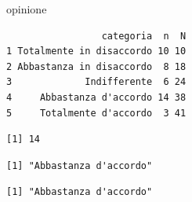 \documentclass[
  a4paper,
  DIV=11,
  numbers=noendperiod]{scrreprt}
\newenvironment{Shaded}{\begin{snugshade}}{\end{snugshade}}
\newcommand{\CommentTok}[1]{\textcolor[rgb]{0.56,0.35,0.01}{\textit{#1}}}
\newcommand{\FunctionTok}[1]{\textcolor[rgb]{0.13,0.29,0.53}{\textbf{#1}}}
\newcommand{\NormalTok}[1]{#1}
\newcommand{\SpecialCharTok}[1]{\textcolor[rgb]{0.81,0.36,0.00}{\textbf{#1}}}
\newcommand{\StringTok}[1]{\textcolor[rgb]{0.31,0.60,0.02}{#1}}
\begin{document}
\begin{Shaded}
\begin{Highlighting}[]
\NormalTok{opinione}
\end{Highlighting}
\end{Shaded}

\begin{verbatim}
                 categoria  n  N
1 Totalmente in disaccordo 10 10
2 Abbastanza in disaccordo  8 18
3             Indifferente  6 24
4     Abbastanza d'accordo 14 38
5     Totalmente d'accordo  3 41
\end{verbatim}

\begin{Shaded}
\end{Shaded}

\begin{verbatim}
[1] 14
\end{verbatim}

\begin{Shaded}
\end{Shaded}

\begin{verbatim}
[1] "Abbastanza d'accordo"
\end{verbatim}

\begin{Shaded}
\end{Shaded}

\begin{verbatim}
[1] "Abbastanza d'accordo"
\end{verbatim}
\end{document}
